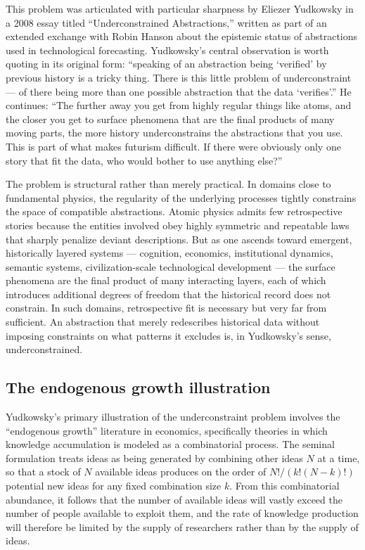 \documentclass[12pt, a4paper]{article}
\theoremstyle{plain}
\theoremstyle{definition}
\theoremstyle{remark}
\begin{document}
This problem was articulated with particular sharpness by Eliezer Yudkowsky in a 2008
essay titled ``Underconstrained Abstractions,'' written as part of an extended exchange
with Robin Hanson about the epistemic status of abstractions used in technological
forecasting.
Yudkowsky's central observation is worth quoting in its original form: ``speaking of an
abstraction being `verified' by previous history is a tricky thing.
There is this little problem of underconstraint --- of there being more than one
possible abstraction that the data `verifies'.''
He continues: ``The further away you get from highly regular things like atoms, and the
closer you get to surface phenomena that are the final products of many moving parts,
the more history underconstrains the abstractions that you use.
This is part of what makes futurism difficult.
If there were obviously only one story that fit the data, who would bother to use
anything else?''

The problem is structural rather than merely practical.
In domains close to fundamental physics, the regularity of the underlying processes
tightly constrains the space of compatible abstractions.
Atomic physics admits few retrospective stories because the entities involved obey
highly symmetric and repeatable laws that sharply penalize deviant descriptions.
But as one ascends toward emergent, historically layered systems --- cognition,
economics, institutional dynamics, semantic systems, civilization-scale technological
development --- the surface phenomena are the final product of many interacting layers,
each of which introduces additional degrees of freedom that the historical record does
not constrain.
In such domains, retrospective fit is necessary but very far from sufficient.
An abstraction that merely redescribes historical data without imposing constraints on
what patterns it excludes is, in Yudkowsky's sense, underconstrained.

\subsection{The endogenous growth illustration}

Yudkowsky's primary illustration of the underconstraint problem involves the
``endogenous growth'' literature in economics, specifically theories in which knowledge
accumulation is modeled as a combinatorial process.
The seminal formulation treats ideas as being generated by combining other ideas $N$ at
a time, so that a stock of $N$ available ideas produces on the order of $N!/(k!(N-k)!)$
potential new ideas for any fixed combination size $k$.
From this combinatorial abundance, it follows that the number of available ideas will
vastly exceed the number of people available to exploit them, and the rate of knowledge
production will therefore be limited by the supply of researchers rather than by the
supply of ideas.
\end{document}
